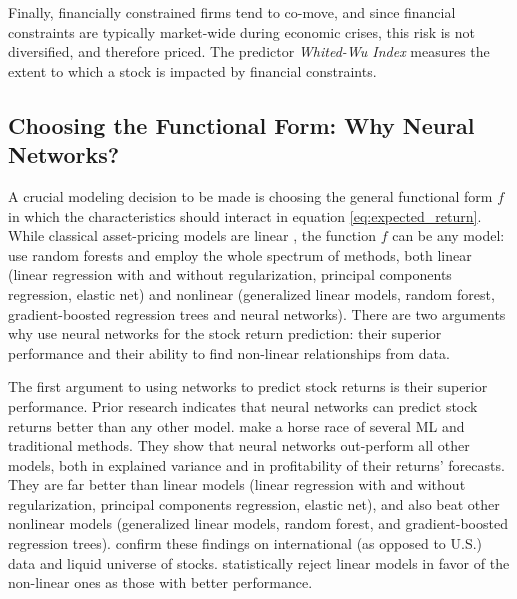 			Finally, financially constrained firms tend to co-move, and since financial constraints are typically market-wide during economic crises, this risk is not diversified, and therefore priced. The predictor \textit{Whited-Wu Index} \citep{whited2006financial} measures the extent to which a stock is impacted by financial constraints.  		
	 	
	 	\subsection{Choosing the Functional Form: Why Neural Networks?}
	 	
		 	A crucial modeling decision to be made is choosing the general functional form $f$ in which the characteristics should interact in equation \ref{eq:expected_return}. While classical asset-pricing models are linear \citep[e.g.][]{fama1993common,fama1996multifactor}, the function $f$ can be any model: \cite{bryzgalova2019forest} use random forests and \cite{gu2020empirical, tobek2020does} employ the whole spectrum of methods, both linear (linear regression with and without regularization, principal components regression, elastic net) and nonlinear (generalized linear models, random forest, gradient-boosted regression trees and neural networks). There are two arguments why use neural networks for the stock return prediction: their superior performance and their ability to find non-linear relationships from data.  
		 	
		 	The first argument to using networks to predict stock returns is their superior performance. Prior research indicates that neural networks can predict stock returns better than any other model. \cite{gu2020empirical} make a horse race of several ML and traditional methods. They show that neural networks out-perform all other models, both in explained variance and in profitability of their returns' forecasts. They are far better than linear models (linear regression with and without regularization, principal components regression, elastic net), and also beat other nonlinear models (generalized linear models, random forest, and gradient-boosted regression trees). \cite{tobek2020does} confirm these findings on international (as opposed to U.S.) data and liquid universe of stocks. \cite{gu2020empirical} statistically reject linear models in favor of the non-linear ones as those with better performance.
		 	
